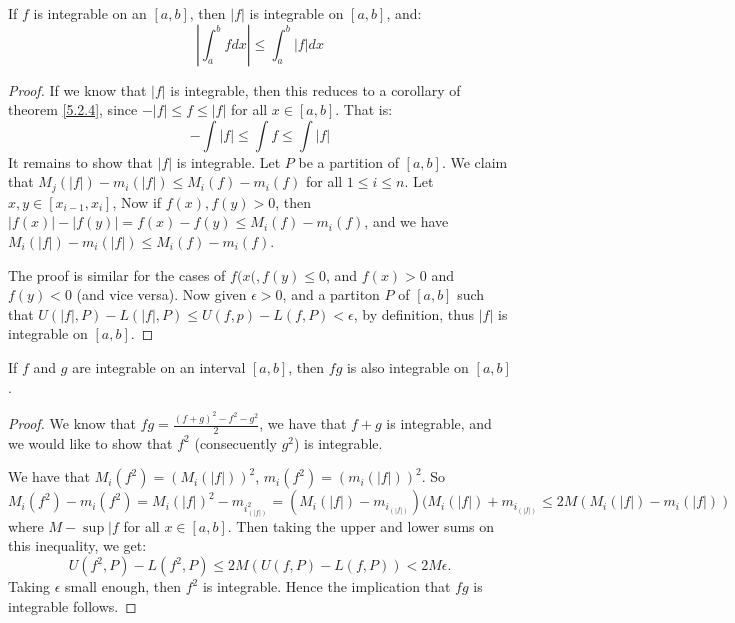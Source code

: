 \begin{theorem}\label{5.2.5}
    If $f$ is integrable on an $[a,b]$, then $|f|$ is integrable on $[a,b]$, and:
        \begin{equation}
            |\int_{a}^{b}{f}dx| \leq \int_{a}^{b}{|f|}dx
        \end{equation}
\end{theorem}
\begin{proof}
    If we know that $|f|$ is integrable, then this reduces to a corollary of theorem \ref{5.2.4},
    since  $-|f| \leq f \leq |f|$ for all  $x \in [a,b]$. That is:
        \begin{equation*}
            -\int{|f|} \leq \int{f} \leq \int{|f|}
        \end{equation*}
        It remains to show that $|f|$ is integrable. Let  $P$ be a partition of  $[a,b]$. 
        We claim that  $M_j(|f|)-m_i(|f|) \leq M_i(f)-m_i(f)$ for all  $1 \leq i \leq n$. Let
        $x,y \in [x_{i-1},x_i]$, Now if $f(x),f(y)>0$, then  $|f(x)|-|f(y)|=f(x)-f(y) \leq
        M_i(f)-m_i(f)$, and we have  $M_i(|f|)-m_i(|f|) \leq M_i(f)-m_i(f)$. 

        The proof is similar for the cases of $f(x(,f(y) \leq 0$, and  $f(x)>0$ and  $f(y)<0$
        (and vice versa). Now given $\epsilon>0$, and a partiton  $P$ of  $[a,b]$ such that
        $U(|f|,P)-L(|f|,P) \leq U(f,p)-L(f,P)<\epsilon$, by definition, thus $|f|$ is integrable
        on  $[a,b]$.
\end{proof}

\begin{theorem}\label{5.2.6}
    If $f$ and  $g$ are integrable on an interval  $[a,b]$, then  $fg$ is also integrable
    on  $[a,b]$.
\end{theorem}
\begin{proof}
    We know that $fg=\frac{(f+g)^2-f^2-g^2}{2}$, we have that $f+g$ is integrable, and we would
    like to show that $f^2$  (consecuently $g^2$) is integrable.

    We have that $M_i(f^2)=(M_i(|f|))^2$, $m_i(f^2)=(m_i(|f|))^2$. So
    $M_i(f^2)-m_i(f^2)=M_i(|f|)^2-m_i_(|f|)^2=(M_i(|f|)-m_i_(|f|))(M_i(|f|)+m_i_(|f|) \leq
    2M(M_i(|f|)-m_i(|f|))$ where $M-\sup{|f}$ for all $x \in [a,b]$. Then taking the upper and
    lower sums on this inequality, we get:
        \begin{equation*}
            U(f^2,P)-L(f^2,P) \leq 2M(U(f,P)-L(f,P))<2M\epsilon.
        \end{equation*}
    Taking $\epsilon$ small enough, then  $f^2$ is integrable. Hence the implication that  $fg$
    is integrable follows.
\end{proof}

